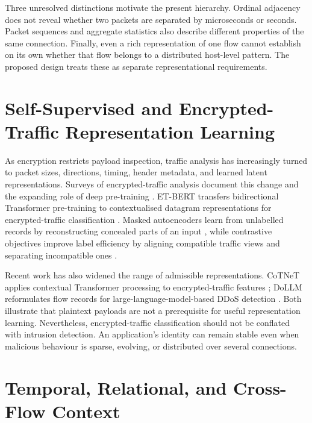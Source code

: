 \documentclass[11pt,fleqn]{report}
\begin{document}
Three unresolved distinctions motivate the present hierarchy. Ordinal adjacency does not reveal whether two packets are separated by microseconds or seconds. Packet sequences and aggregate statistics also describe different properties of the same connection. Finally, even a rich representation of one flow cannot establish on its own whether that flow belongs to a distributed host-level pattern. The proposed design treats these as separate representational requirements.

\section{Self-Supervised and Encrypted-Traffic Representation Learning}
\label{subsec:rw_ssl_encrypted}

As encryption restricts payload inspection, traffic analysis has increasingly turned to packet sizes, directions, timing, header metadata, and learned latent representations. Surveys of encrypted-traffic analysis document this change and the expanding role of deep pre-training \cite{Sharma2025EncryptedSurvey,Dong2025EncryptedPretrain}. ET-BERT transfers bidirectional Transformer pre-training to contextualised datagram representations for encrypted-traffic classification \cite{Lin2022ETBERT}. Masked autoencoders learn from unlabelled records by reconstructing concealed parts of an input \cite{Zhao2024MAETraffic,2024MAETraffic}, while contrastive objectives improve label efficiency by aligning compatible traffic views and separating incompatible ones \cite{Li2024Contrastive}.

Recent work has also widened the range of admissible representations. CoTNeT applies contextual Transformer processing to encrypted-traffic features \cite{Huang2024CoTNet}; DoLLM reformulates flow records for large-language-model-based DDoS detection \cite{Li2024DoLLM}. Both illustrate that plaintext payloads are not a prerequisite for useful representation learning. Nevertheless, encrypted-traffic classification should not be conflated with intrusion detection. An application's identity can remain stable even when malicious behaviour is sparse, evolving, or distributed over several connections.

\section{Temporal, Relational, and Cross-Flow Context}
\label{subsec:rw_cross_flow}
\end{document}
